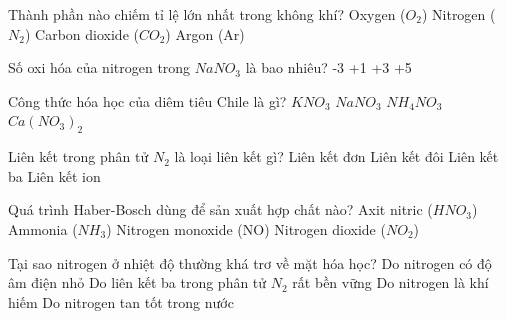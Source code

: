 
\begin{ex}
    Thành phần nào chiếm tỉ lệ lớn nhất trong không khí?
    \choice
    {Oxygen ($O_2$)}
    {\True Nitrogen ($N_2$)}
    {Carbon dioxide ($CO_2$)}
    {Argon (Ar)}
\end{ex}

\begin{ex}
    Số oxi hóa của nitrogen trong $NaNO_3$ là bao nhiêu?
    \choice
    {-3}
    {+1}
    {+3}
    {\True +5}
\end{ex}

\begin{ex}
    Công thức hóa học của diêm tiêu Chile là gì?
    \choice
    {$KNO_3$}
    {\True $NaNO_3$}
    {$NH_4NO_3$}
    {$Ca(NO_3)_2$}
\end{ex}

\begin{ex}
    Liên kết trong phân tử $N_2$ là loại liên kết gì?
    \choice
    {Liên kết đơn}
    {Liên kết đôi}
    {\True Liên kết ba}
    {Liên kết ion}
\end{ex}

\begin{ex}
    Quá trình Haber-Bosch dùng để sản xuất hợp chất nào?
    \choice
    {Axit nitric ($HNO_3$)}
    {\True Ammonia ($NH_3$)}
    {Nitrogen monoxide (NO)}
    {Nitrogen dioxide ($NO_2$)}
\end{ex}

\begin{ex}
    Tại sao nitrogen ở nhiệt độ thường khá trơ về mặt hóa học?
    \choice
    {Do nitrogen có độ âm điện nhỏ}
    {\True Do liên kết ba trong phân tử $N_2$ rất bền vững}
    {Do nitrogen là khí hiếm}
    {Do nitrogen tan tốt trong nước}
\end{ex}

